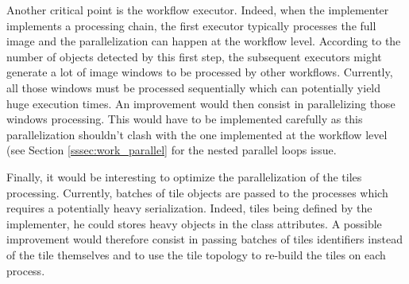 Another critical point is the workflow executor. Indeed, when the implementer implements a processing chain, the first executor typically processes the full image and the parallelization can happen at the workflow level. According to the number of objects detected by this first step, the subsequent executors might generate a lot of image windows to be processed by other workflows. Currently, all those windows must be processed sequentially which can potentially yield huge execution times. An improvement would then consist in parallelizing those windows processing. This would have to be implemented carefully as this parallelization shouldn't clash with the one implemented at the workflow level (see Section \ref{sssec:work_parallel} for the nested parallel loops issue.

Finally, it would be interesting to optimize the parallelization of the tiles processing. Currently, batches of tile objects are passed to the processes which requires a potentially heavy serialization. Indeed, tiles being defined by the implementer, he could stores heavy objects in the class attributes. A possible improvement would therefore consist in passing batches of tiles identifiers instead of the tile themselves and to use the tile topology to re-build the tiles on each process. 

\label{sec:work_improvements}
